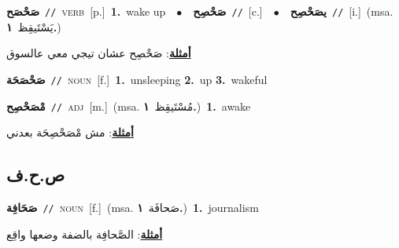 \documentclass[10pt,a4paper,twoside]{article} %
\begin{document}
\begin{multicols}{2}
{\setlength\topsep{0pt}\textbf{\foreignlanguage{arabic}{صَحْصَح}}\ {\color{gray}\texttt{//}\color{black}}\ \textsc{verb}\ [p.]\ \textbf{1.}~wake up\ \ $\bullet$\ \ \setlength\topsep{0pt}\textbf{\foreignlanguage{arabic}{صَحْصِح}}\ {\color{gray}\texttt{//}\color{black}}\ [c.]\ \ $\bullet$\ \ \setlength\topsep{0pt}\textbf{\foreignlanguage{arabic}{يصَحْصِح}}\ {\color{gray}\texttt{//}\color{black}}\ [i.]\ \color{gray}(msa. \foreignlanguage{arabic}{يَسْتَيقِظ}~\foreignlanguage{arabic}{\textbf{١.}})\color{black}\  \begin{flushright}\color{gray}\foreignlanguage{arabic}{\textbf{\underline{\foreignlanguage{arabic}{أمثلة}}}: صَحْصِح عشان تيجي معي عالسوق}\end{flushright}\color{black}} \vspace{2mm}

{\setlength\topsep{0pt}\textbf{\foreignlanguage{arabic}{صَحْصَحَة}}\ {\color{gray}\texttt{//}\color{black}}\ \textsc{noun}\ [f.]\ \textbf{1.}~unsleeping  \textbf{2.}~up  \textbf{3.}~wakeful\ } \vspace{2mm}

{\setlength\topsep{0pt}\textbf{\foreignlanguage{arabic}{مْصَحْصِح}}\ {\color{gray}\texttt{//}\color{black}}\ \textsc{adj}\ [m.]\ \color{gray}(msa. \foreignlanguage{arabic}{مُسْتَيقِظ}~\foreignlanguage{arabic}{\textbf{١.}})\color{black}\ \textbf{1.}~awake\  \begin{flushright}\color{gray}\foreignlanguage{arabic}{\textbf{\underline{\foreignlanguage{arabic}{أمثلة}}}: مش مْصَحْصِحَة بعدني}\end{flushright}\color{black}} \vspace{2mm}

\vspace{-3mm}
\subsection*{\color{blue}\foreignlanguage{arabic}{ص.ح.ف}\color{blue}{}} 

{\setlength\topsep{0pt}\textbf{\foreignlanguage{arabic}{صَحَافِة}}\ {\color{gray}\texttt{//}\color{black}}\ \textsc{noun}\ [f.]\ \color{gray}(msa. \foreignlanguage{arabic}{صَحافَة}~\foreignlanguage{arabic}{\textbf{١.}})\color{black}\ \textbf{1.}~journalism\  \begin{flushright}\color{gray}\foreignlanguage{arabic}{\textbf{\underline{\foreignlanguage{arabic}{أمثلة}}}: الصَّحافِة بالضفة وضعها واقِع}\end{flushright}\color{black}} \vspace{2mm}


\end{multicols}
\end{document}
